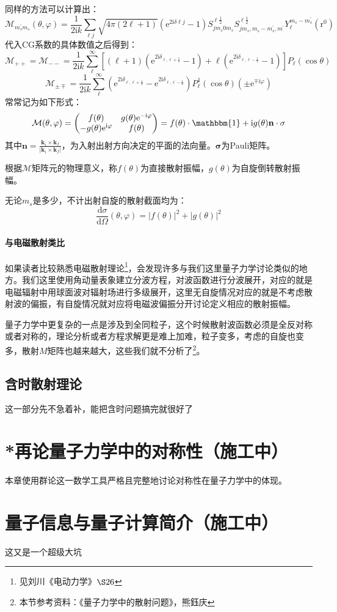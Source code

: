 \documentclass[a4paper,zihao=-4,linespread=1]{ctexrep}
\begin{document}
	同样的方法可以计算出：
	\begin{equation}
		\mathcal{M}_{m_s^\prime m_s}(\theta,\varphi)=\frac{1}{2\mathrm{i}k}\sum_{\ell j}\sqrt{4\pi(2\ell+1)}\left(\mathrm{e}^{2\mathrm{i}\delta{\ell j}}-1\right)S^{\ell\frac{1}{2}}_{jm_s0m_s}S^{\ell\frac{1}{2}}_{jm_s,m_s-m_s^\prime,m^\prime}Y^{m_s-m_s^\prime}_\ell(\mathrm{r}^0)
	\end{equation}
	代入CG系数的具体数值之后得到：
	\[\mathcal{M}_{++}=\mathcal{M}_{--}=\frac{1}{2\mathrm{i}k}\sum_\ell^{\infty}\left[(\ell+1)\left(\mathrm{e}^{2\mathrm{i}\delta_{\ell,\ell+\frac{1}{2}}}-1\right)+\ell\left(\mathrm{e}^{2\mathrm{i}\delta_{\ell,\ell-\frac{1}{2}}}-1\right)\right]P_\ell(\cos\theta)\]
	\[\mathcal{M}_{\pm\mp}=\frac{1}{2\mathrm{i}k}\sum_\ell^{\infty}\left(\mathrm{e}^{2\mathrm{i}\delta_{\ell,\ell+\frac{1}{2}}}-\mathrm{e}^{2\mathrm{i}\delta_{\ell,\ell-\frac{1}{2}}}\right)P_\ell^1(\cos\theta)\left(\pm\mathrm{e}^{\mp\mathrm{i}\varphi}\right)\]
	常常记为如下形式：
	\[
	\mathcal{M}(\theta,\varphi)=\begin{pmatrix}
	f(\theta)	& g(\theta)\mathrm{e}^{-\mathrm{i}\varphi}\\
	-g(\theta)\mathrm{e}^{\mathrm{i}\varphi}	&f(\theta)
	\end{pmatrix}=f(\theta)\cdot\mathbbm{1}+\mathrm{i}g(\theta)\mathbf{n}\cdot\mathbf{\sigma}
	\]
	其中$\mathbf{n}=\frac{\mathbf{k}_i\times\mathbf{k}_f}{|\mathbf{k}_i\times\mathbf{k}_f|}$，为入射出射方向决定的平面的法向量。$\mathbf{\sigma}$为Pauli矩阵。
	
	根据$\mathcal{M}$矩阵元的物理意义，称$f(\theta)$为直接散射振幅，$g(\theta)$为自旋倒转散射振幅。
	
	无论$m_s$是多少，不计出射自旋的散射截面均为：
	\[\frac{\mathrm{d}\sigma}{\mathrm{d}\Omega}(\theta,\varphi)=|f(\theta)|^2+|g(\theta)|^2\]
	\subsubsection{与电磁散射类比}
	如果读者比较熟悉电磁散射理论\footnote{见刘川《电动力学》$\S26$}，会发现许多与我们这里量子力学讨论类似的地方。我们这里使用角动量表象建立分波方程，对波函数进行分波展开，对应的就是电磁辐射中用球面波对辐射场进行多级展开，这里无自旋情况对应的就是不考虑散射波的偏振，有自旋情况就对应将电磁波偏振分开讨论定义相应的散射振幅。
	
	量子力学中更复杂的一点是涉及到全同粒子，这个时候散射波函数必须是全反对称或者对称的，理论分析或者方程求解更是难上加难，粒子变多，考虑的自旋也变多，散射$M$矩阵也越来越大，这些我们就不分析了\footnote{本节参考资料：《量子力学中的散射问题》，熊鈺庆}。
	\section{含时散射理论}
	这一部分先不急着补，能把含时问题搞完就很好了
	
	
	\chapter{*再论量子力学中的对称性（施工中）}
	本章使用群论这一数学工具严格且完整地讨论对称性在量子力学中的体现。
	
	\chapter{量子信息与量子计算简介（施工中）}
	这又是一个超级大坑
	
	
     
    
\end{document}
